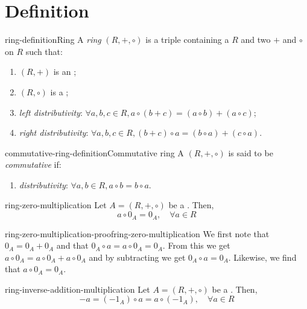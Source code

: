 \documentclass[preview]{standalone}
\begin{document}
\genpage

\section{Definition}

\begin{snippetdefinition}{ring-definition}{Ring}
    A \textit{ring} \((R, +, \circ)\) is a triple containing a \set \(R\) and two 
    \(+\) and \(\circ\) on \(R\) such that:
    \begin{enumerate}
        \item \((R, +)\) is an \abeliangroup;
        \item \((R, \circ)\) is a \monoid;
        \item \textit{left distributivity}: \(\forall a,b,c\in R, a\circ(b+c) = (a\circ b) + (a \circ c)\);
        \item \textit{right distributivity}: \(\forall a,b,c\in R, (b+c)\circ a = (b\circ a) + (c \circ a)\).
    \end{enumerate}
\end{snippetdefinition}

\begin{snippetdefinition}{commutative-ring-definition}{Commutative ring}
    A \ring \((R, +, \circ)\) is said to be \textit{commutative} if:
    \begin{enumerate}
        \item \textit{distributivity}: \(\forall a,b\in R, a\circ b = b\circ a\).
    \end{enumerate}
\end{snippetdefinition}

\begin{snippetproposition}{ring-zero-multiplication}{}
    Let \(A = (R, +, \circ)\) be a \ring. Then, \[
        a \circ 0_A = 0_A, \quad \forall a \in R
    \]
\end{snippetproposition}

\begin{snippetproof}{ring-zero-multiplication-proof}{ring-zero-multiplication}{}
    We first note that \(0_A = 0_A + 0_A\)
    and that \(0_A \circ a = a \circ 0_A = 0_A\).
    From this we get \(a \circ 0_A = a \circ 0_A + a \circ 0_A\)
    and by subtracting we get \(0_A \circ a = 0_A\).
    Likewise, we find that \(a \circ 0_A = 0_A\).
\end{snippetproof}

\begin{snippetproposition}{ring-inverse-addition-multiplication}{}
    Let \(A = (R, +, \circ)\) be a \ring. Then, \[
        - a = (- 1_A) \circ a = a \circ (- 1_A), \quad \forall a \in R
    \]
\end{snippetproposition}
\end{document}
